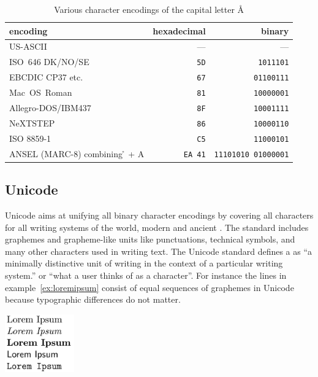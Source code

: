 \begin{table}[h]
\centering
\begin{tabular}{l|r|r}
 \textbf{encoding} & \textbf{hexadecimal} & \textbf{binary} \\
\hline
 US-ASCII           & --- & --- \\
\hline
 ISO~646 DK/NO/SE   & \verb|5D| & \verb| 1011101| \\
\hline
 EBCDIC CP37 etc.   & \verb|67| & \verb|01100111| \\
\hline
 Mac~OS~Roman       & \verb|81| & \verb|10000001| \\
\hline
 Allegro-DOS/IBM437 & \verb|8F| & \verb|10001111| \\
\hline
 NeXTSTEP           & \verb|86| & \verb|10000110| \\
\hline
 ISO 8859-1         & \verb|C5| & \verb|11000101| \\
\hline
 ANSEL (MARC-8) combining \r{} + A & \verb|EA 41| 
  & \verb|11101010 01000001| \\
\end{tabular}
\caption{Various character encodings of the capital letter \r{A}}
\label{tab:aringencodings}
\end{table}

\subsection{Unicode}
\label{sec:Unicode}

Unicode aims at unifying all binary character encodings by covering all
characters for all writing systems of the world, modern and ancient
\cite{Unicode6}. The standard includes graphemes and grapheme-like units like
punctuations, technical symbols, and many other characters used in writing
text. The Unicode standard defines a  as ``a minimally
distinctive unit of writing in the context of a particular writing system.'' or
``what a user thinks of as a character''.  For instance the lines in
example~\ref{ex:loremipsum} consist of equal sequences of graphemes in Unicode
because typographic differences do not matter.

\begin{example}
\centering
\includegraphics[width=3cm]{img/loremipsum.jpg}
\caption{Equal sequences of graphemes (if encoded in Unicode) }
\label{ex:loremipsum}
\end{example}

